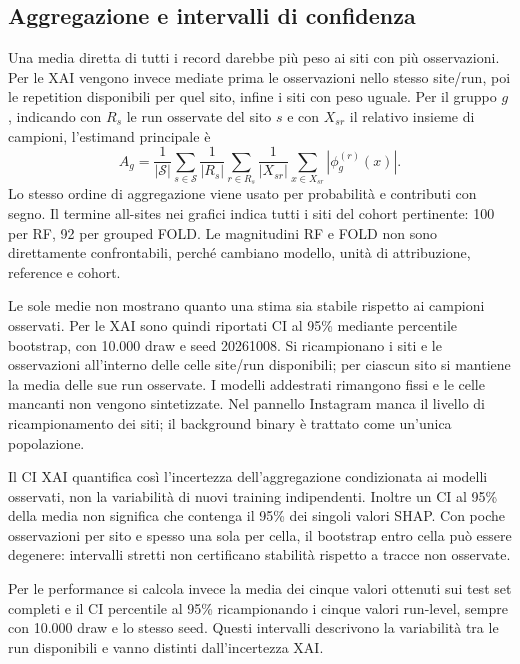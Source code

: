 \documentclass[11pt,a4paper]{article}
\begin{document}
\subsection{Aggregazione e intervalli di confidenza}
Una media diretta di tutti i record darebbe più peso ai siti con più osservazioni. Per le XAI vengono invece mediate prima le osservazioni nello stesso site/run, poi le repetition disponibili per quel sito, infine i siti con peso uguale. Per il gruppo $g$, indicando con $R_s$ le run osservate del sito $s$ e con $X_{sr}$ il relativo insieme di campioni, l'estimand principale è
\begin{equation}
 A_g=\frac{1}{|\mathcal S|}\sum_{s\in\mathcal S}\frac{1}{|R_s|}\sum_{r\in R_s}\frac{1}{|X_{sr}|}\sum_{x\in X_{sr}}|\phi_g^{(r)}(x)|.
 \label{eq:crossrun-aggregation}
\end{equation}
Lo stesso ordine di aggregazione viene usato per probabilità e contributi con segno. Il termine all-sites nei grafici indica tutti i siti del cohort pertinente: 100 per RF, 92 per grouped FOLD. Le magnitudini RF e FOLD non sono direttamente confrontabili, perché cambiano modello, unità di attribuzione, reference e cohort.

Le sole medie non mostrano quanto una stima sia stabile rispetto ai campioni osservati. Per le XAI sono quindi riportati CI al 95\% mediante percentile bootstrap, con 10.000 draw e seed 20261008. Si ricampionano i siti e le osservazioni all'interno delle celle site/run disponibili; per ciascun sito si mantiene la media delle sue run osservate. I modelli addestrati rimangono fissi e le celle mancanti non vengono sintetizzate. Nel pannello Instagram manca il livello di ricampionamento dei siti; il background binary è trattato come un'unica popolazione.

Il CI XAI quantifica così l'incertezza dell'aggregazione condizionata ai modelli osservati, non la variabilità di nuovi training indipendenti. Inoltre un CI al 95\% della media non significa che contenga il 95\% dei singoli valori SHAP. Con poche osservazioni per sito e spesso una sola per cella, il bootstrap entro cella può essere degenere: intervalli stretti non certificano stabilità rispetto a tracce non osservate.

Per le performance si calcola invece la media dei cinque valori ottenuti sui test set completi e il CI percentile al 95\% ricampionando i cinque valori run-level, sempre con 10.000 draw e lo stesso seed. Questi intervalli descrivono la variabilità tra le run disponibili e vanno distinti dall'incertezza XAI.
\end{document}
